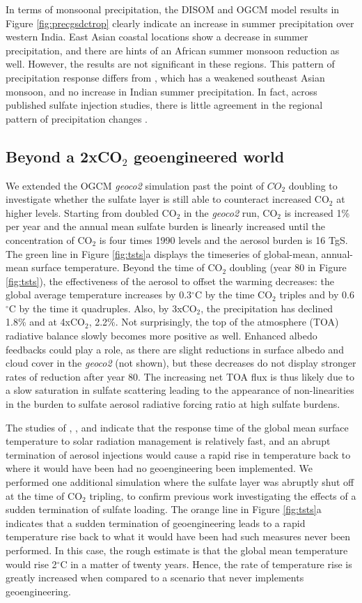 \documentclass[12pt]{article}
\newcommand{\sectdef}{\subsection} %
\begin{document}
In terms of monsoonal precipitation, the DISOM and OGCM model results in Figure \ref{fig:precgsdctrop} clearly indicate an increase in summer precipitation over western India. East Asian coastal locations show a decrease in summer precipitation, and there are hints of an African summer monsoon reduction as well. However, the results are not significant in these regions. This pattern of precipitation response differs from \citet{robock08}, which has a weakened southeast Asian monsoon, and no increase in Indian summer precipitation. In fact, across published sulfate injection studies, there is little agreement in the regional pattern of precipitation changes \citep{robock08, rasch08b, jones10}. 

\sectdef{Beyond a 2xCO$_2$ geoengineered world}

We extended the OGCM \textit{geoco2} simulation past the point of $CO_2$ doubling to investigate whether the sulfate layer is still able to counteract increased CO$_2$ at higher levels. Starting from doubled CO$_2$ in the \textit{geoco2} run, CO$_2$ is increased 1\% per year and the annual mean sulfate burden is linearly increased until the concentration of CO$_2$ is four times 1990 levels and the aerosol burden is 16 TgS. The green line in Figure \ref{fig:tsts}a displays the timeseries of global-mean, annual-mean surface temperature. Beyond the time of CO$_2$ doubling (year 80 in Figure \ref{fig:tsts}), the effectiveness of the aerosol to offset the warming decreases: the global average temperature increases by 0.3$^\circ$C by the time CO$_2$ triples and by 0.6$^\circ$C by the time it quadruples. Also, by 3xCO$_2$, the precipitation has declined 1.8\% and at 4xCO$_2$, 2.2\%. Not surprisingly, the top of the atmosphere (TOA) radiative balance slowly becomes more positive as well. Enhanced albedo feedbacks could play a role, as there are slight reductions in surface albedo and cloud cover in the \textit{geoco2} (not shown), but these decreases do not display stronger rates of reduction after year 80. The increasing net TOA flux is thus likely due to a slow saturation in sulfate scattering leading to the appearance of non-linearities in the burden to sulfate aerosol radiative forcing ratio at high sulfate burdens. 

The studies of \cite{matthews07}, \cite{robock08}, and \cite{jones10} indicate that the response time of the global mean surface temperature to solar radiation management is relatively fast, and an abrupt termination of aerosol injections would cause a rapid rise in temperature back to where it would have been had no geoengineering been implemented. We performed one additional simulation where the sulfate layer was abruptly shut off at the time of CO$_2$ tripling, to confirm previous work investigating the effects of a sudden termination of sulfate loading. The orange line in Figure \ref{fig:tsts}a indicates that a sudden termination of geoengineering leads to a rapid temperature rise back to what it would have been had such measures never been performed. In this case, the rough estimate is that the global mean temperature would rise 2$^\circ$C in a matter of twenty years. Hence, the rate of temperature rise is greatly increased when compared to a scenario that never implements geoengineering.
\end{document}
